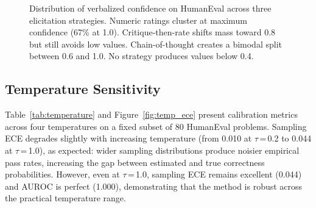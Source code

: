 \documentclass{article}
\begin{document}
\begin{figure}[t]
\centering
{}
\caption{Distribution of verbalized confidence on HumanEval across three elicitation strategies. Numeric ratings cluster at maximum confidence (67\% at 1.0). Critique-then-rate shifts mass toward 0.8 but still avoids low values. Chain-of-thought creates a bimodal split between 0.6 and 1.0. No strategy produces values below 0.4.}
\label{fig:verbal_dist}
\vspace{-0.5em}
\end{figure}

\subsection{Temperature Sensitivity}
\label{sec:temp}

Table~\ref{tab:temperature} and Figure~\ref{fig:temp_ece} present calibration metrics across four temperatures on a fixed subset of 80 HumanEval problems. Sampling ECE degrades slightly with increasing temperature (from 0.010 at $\tau$\,=\,0.2 to 0.044 at $\tau$\,=\,1.0), as expected: wider sampling distributions produce noisier empirical pass rates, increasing the gap between estimated and true correctness probabilities. However, even at $\tau$\,=\,1.0, sampling ECE remains excellent (0.044) and AUROC is perfect (1.000), demonstrating that the method is robust across the practical temperature range.
\end{document}
